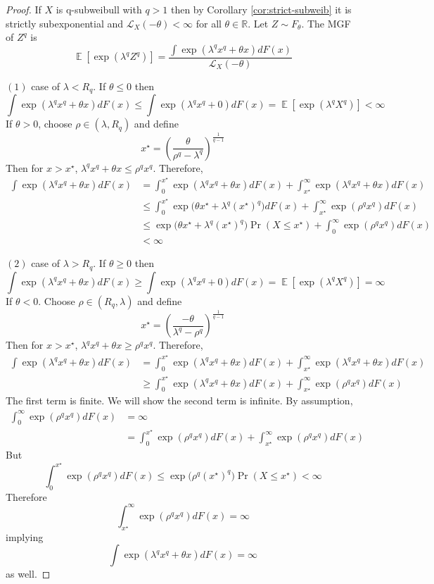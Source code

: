\documentclass{article}
\theoremstyle{definition}
\DeclareMathOperator{\E}{\mathbb{E}}
\begin{document}
\begin{proof}
If $X$ is q-subweibull with $q>1$ then by Corollary \ref{cor:strict-subweib} it is strictly subexponential and $\mathcal{L}_X(-\theta)<\infty$ for all $\theta\in\mathbb{R}$. Let $Z\sim F_\theta$. The MGF of $Z^q$ is
\[\E[\exp(\lambda^q Z^q)] = \frac{\int \exp(\lambda^q x^q + \theta x) dF(x)}{\mathcal{L}_X(-\theta)}\]

$(1)$ case of $\lambda<R_q$. If $\theta\leq 0$ then 
\[\int \exp(\lambda^q x^q + \theta x) dF(x)\leq \int \exp(\lambda^q x^q + 0) dF(x) = \E[\exp(\lambda^q X^q)]<\infty\]
If $\theta>0$, choose $\rho\in (\lambda,R_q)$ and define
\[x^\star = \left(\frac{\theta}{\rho^q-\lambda^q}\right)^{\frac{1}{q-1}}\]
Then for $x>x^\star$, $\lambda^q x^q + \theta x\leq \rho^q x^q$. Therefore,
\begin{align*}
\int \exp(\lambda^q x^q + \theta x) dF(x) &= \int_0^{x^\star} \exp(\lambda^q x^q + \theta x) dF(x) + \int_{x^\star}^\infty \exp(\lambda^q x^q + \theta x) dF(x)\\
&\leq \int_0^{x^\star}\exp\big(\theta x^\star + \lambda^q (x^\star)^q\big)dF(x) + \int_{x^\star}^\infty \exp(\rho^q x^q) dF(x)\\
&\leq \exp\big(\theta x^\star + \lambda^q (x^\star)^q\big) \Pr(X\leq x^\star) + \int_0^\infty \exp(\rho^q x^q) dF(x)\\
&<\infty
\end{align*}

$(2)$ case of $\lambda>R_q$. If $\theta\geq 0$ then
\[\int \exp(\lambda^q x^q + \theta x) dF(x)\geq \int \exp(\lambda^q x^q + 0) dF(x) = \E[\exp(\lambda^q X^q)] = \infty\]
If $\theta<0$. Choose $\rho\in (R_q,\lambda)$ and define
\[x^\star = \left(\frac{-\theta}{\lambda^q-\rho^q}\right)^{\frac{1}{q-1}}\]
Then for $x>x^\star$, $\lambda^q x^q + \theta x\geq \rho^q x^q$. Therefore,
\begin{align*}
\int \exp(\lambda^q x^q + \theta x) dF(x) &= \int_0^{x^\star} \exp(\lambda^q x^q + \theta x) dF(x) + \int_{x^\star}^\infty \exp(\lambda^q x^q + \theta x) dF(x)\\
&\geq \int_0^{x^\star}\exp(\lambda^q x^q + \theta x)dF(x) + \int_{x^\star}^\infty \exp(\rho^q x^q) dF(x)
\end{align*}
The first term is finite. We will show the second term is infinite. By assumption,
\begin{align*}
\int_0^\infty \exp(\rho^q x^q) dF(x) &= \infty\\
&= \int_0^{x^\star} \exp(\rho^q x^q) dF(x)+\int_{x^\star}^\infty \exp(\rho^q x^q) dF(x)
\end{align*}
But 
\[\int_0^{x^\star} \exp(\rho^q x^q) dF(x)\leq \exp\big(\rho^q (x^\star)^q\big)\Pr(X\leq x^\star)<\infty\]
Therefore
\[\int_{x^\star}^\infty \exp(\rho^q x^q) dF(x) = \infty\]
implying
\[\int \exp(\lambda^q x^q + \theta x) dF(x)=\infty\]
as well.


\end{proof}
\end{document}
